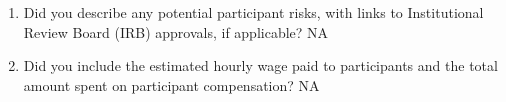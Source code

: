 \begin{enumerate}
\begin{enumerate}
\item  Did you describe any potential participant risks, with links to Institutional Review Board (IRB) approvals, if applicable? NA



\item  Did you include the estimated hourly wage paid to participants and the total amount spent on participant compensation? NA


\end{enumerate}
\end{enumerate}